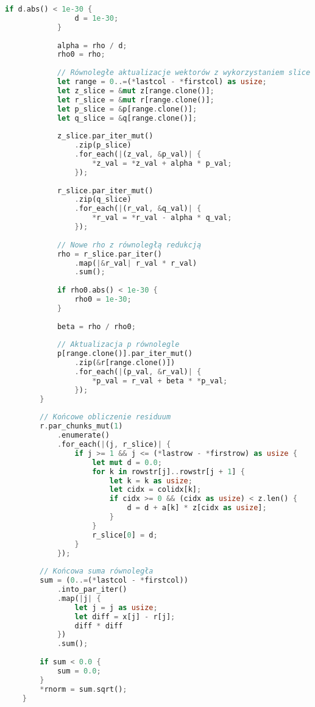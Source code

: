 \begin{lstlisting}[language=Rust, caption={Implementacja benchmarku CG w języku Rust}, label={lst:cg_rust}]
            if d.abs() < 1e-30 {
                d = 1e-30;
            }
    
            alpha = rho / d;
            rho0 = rho;
    
            // Równoległe aktualizacje wektorów z wykorzystaniem slice
            let range = 0..=(*lastcol - *firstcol) as usize;
            let z_slice = &mut z[range.clone()];
            let r_slice = &mut r[range.clone()];
            let p_slice = &p[range.clone()];
            let q_slice = &q[range.clone()];
    
            z_slice.par_iter_mut()
                .zip(p_slice)
                .for_each(|(z_val, &p_val)| {
                    *z_val = *z_val + alpha * p_val;
                });
    
            r_slice.par_iter_mut()
                .zip(q_slice)
                .for_each(|(r_val, &q_val)| {
                    *r_val = *r_val - alpha * q_val;
                });
    
            // Nowe rho z równoległą redukcją
            rho = r_slice.par_iter()
                .map(|&r_val| r_val * r_val)
                .sum();
    
            if rho0.abs() < 1e-30 {
                rho0 = 1e-30;
            }
    
            beta = rho / rho0;
    
            // Aktualizacja p równolegle
            p[range.clone()].par_iter_mut()
                .zip(&r[range.clone()])
                .for_each(|(p_val, &r_val)| {
                    *p_val = r_val + beta * *p_val;
                });
        }
    
        // Końcowe obliczenie residuum
        r.par_chunks_mut(1)
            .enumerate()
            .for_each(|(j, r_slice)| {
                if j >= 1 && j <= (*lastrow - *firstrow) as usize {
                    let mut d = 0.0;
                    for k in rowstr[j]..rowstr[j + 1] {
                        let k = k as usize;
                        let cidx = colidx[k];
                        if cidx >= 0 && (cidx as usize) < z.len() {
                            d = d + a[k] * z[cidx as usize];
                        }
                    }
                    r_slice[0] = d;
                }
            });
    
        // Końcowa suma równoległa
        sum = (0..=(*lastcol - *firstcol))
            .into_par_iter()
            .map(|j| {
                let j = j as usize;
                let diff = x[j] - r[j];
                diff * diff
            })
            .sum();
    
        if sum < 0.0 {
            sum = 0.0;
        }
        *rnorm = sum.sqrt();
    }
\end{lstlisting}
